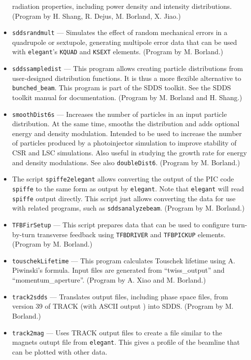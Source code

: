 \documentclass[11pt]{article}
\begin{document}
\begin{itemize}
  radiation properties, including power density and intensity distributions.  (Program by H. Shang, R. Dejus, M. Borland, X. Jiao.)
\item {\tt sddsrandmult} --- Simulates the effect of random mechanical errors in a quadrupole or sextupole,
  generating multipole error data that can be used with {\tt elegant}'s {\tt KQUAD} and {\tt KSEXT}
  elements. (Program by M. Borland.)
\item {\tt sddssampledist} --- This program allows creating particle
        distributions from user-designed distribution functions.  It is thus a more flexible alternative
        to \verb|bunched_beam|.  This program is part of the SDDS toolkit.  See the SDDS toolkit
        manual for documentation.  (Program by M. Borland and H. Shang.)
\item {\tt smoothDist6s} --- Increases the number of particles in an input particle distribution.  At the same
 time, smooths the distribution and adds optional energy and density modulation.   Intended to be used to increase the number of particles
 produced by a photoinjector simulation to improve stability of CSR and LSC simulations.  Also useful in studying 
 the growth rate for energy and density modulations.  See also {\tt doubleDist6}.
  (Program by M. Borland.)
\item The script \verb|spiffe2elegant| allows converting the output of the PIC code \verb|spiffe| to the same form
  as output by \verb|elegant|.  Note that \verb|elegant| will read \verb|spiffe| output directly. This script just allows converting the
  data for use with related programs, such as \verb|sddsanalyzebeam|.
  (Program by M. Borland.)
\item {\tt TFBFirSetup} --- This script prepares data that can be used to configure turn-by-turn transverse feedback using
  \verb|TFBDRIVER| and \verb|TFBPICKUP| elements.
  (Program by M. Borland.)
\item {\tt touschekLifetime} --- This program calculates Touschek lifetime using A. Piwinski's formula.
        Input files are generated from ``twiss\_output'' and ``momentum\_aperture''.  (Program by A. Xiao and M. Borland.)
\item {\tt track2sdds} --- Translates output files, including phase space files, from version 39 of TRACK (with ASCII output \cite{TRACK})
  into SDDS. 
  (Program by M. Borland.)
\item {\tt track2mag} --- Uses TRACK output files to create a file similar to the magnets outupt file from {\tt elegant}.
  This gives a profile of the beamline that can be plotted with other data.

\end{itemize}
\end{document}
